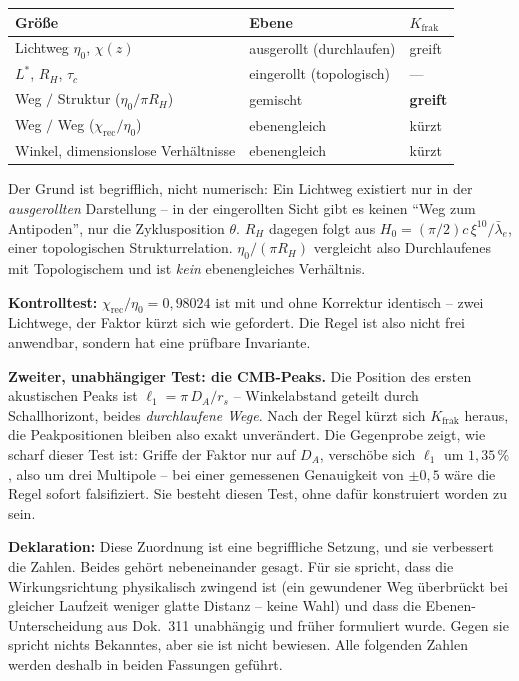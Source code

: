 \documentclass[11pt]{report}
\begin{document}
\begin{center}
\begin{tabular}{lll}
\toprule
Größe & Ebene & $K_\text{frak}$ \\
\midrule
Lichtweg $\eta_0$, $\chi(z)$ & ausgerollt (durchlaufen) & greift \\
$L^{*}$, $R_H$, $\tau_c$ & eingerollt (topologisch) & --- \\
Weg $/$ Struktur ($\eta_0/\pi R_H$) & gemischt & \textbf{greift} \\
Weg $/$ Weg ($\chi_\text{rec}/\eta_0$) & ebenengleich & kürzt \\
Winkel, dimensionslose Verhältnisse & ebenengleich & kürzt \\
\bottomrule
\end{tabular}
\end{center}

Der Grund ist begrifflich, nicht numerisch: Ein Lichtweg existiert
nur in der \emph{ausgerollten} Darstellung -- in der eingerollten
Sicht gibt es keinen \enquote{Weg zum Antipoden}, nur die
Zyklusposition $\theta$. $R_H$ dagegen folgt aus
$H_0 = (\pi/2)c\,\xi^{10}/\bar\lambda_e$, einer topologischen
Strukturrelation. $\eta_0/(\pi R_H)$ vergleicht also Durchlaufenes
mit Topologischem und ist \emph{kein} ebenengleiches Verhältnis.

\textbf{Kontrolltest:} $\chi_\text{rec}/\eta_0 = 0{,}98024$ ist
mit und ohne Korrektur identisch -- zwei Lichtwege, der Faktor
kürzt sich wie gefordert. Die Regel ist also nicht frei
anwendbar, sondern hat eine prüfbare Invariante.

\textbf{Zweiter, unabhängiger Test: die CMB-Peaks.} Die Position
des ersten akustischen Peaks ist
$\ell_1 = \pi\,D_A/r_s$ -- Winkelabstand geteilt durch
Schallhorizont, beides \emph{durchlaufene Wege}. Nach der Regel
kürzt sich $K_\text{frak}$ heraus, die Peakpositionen bleiben also
exakt unverändert. Die Gegenprobe zeigt, wie scharf dieser Test
ist: Griffe der Faktor nur auf $D_A$, verschöbe sich $\ell_1$ um
$1{,}35\,\%$, also um drei Multipole -- bei einer gemessenen
Genauigkeit von $\pm0{,}5$ wäre die Regel sofort falsifiziert.
Sie besteht diesen Test, ohne dafür konstruiert worden zu sein.

\textbf{Deklaration:} Diese Zuordnung ist eine begriffliche
Setzung, und sie verbessert die Zahlen. Beides gehört
nebeneinander gesagt. Für sie spricht, dass die Wirkungsrichtung
physikalisch zwingend ist (ein gewundener Weg überbrückt bei
gleicher Laufzeit weniger glatte Distanz -- keine Wahl) und dass
die Ebenen-Unterscheidung aus Dok.~311 unabhängig und früher
formuliert wurde. Gegen sie spricht nichts Bekanntes, aber sie ist
nicht bewiesen. Alle folgenden Zahlen werden deshalb in beiden
Fassungen geführt.
\end{document}
